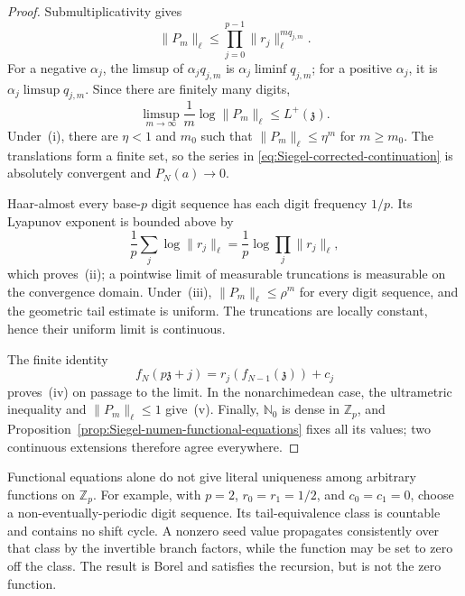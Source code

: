\begin{proof}
Submultiplicativity gives
\[
 \lVert P_m\rVert_\ell
 \leq\prod_{j=0}^{p-1}
      \lVert r_j\rVert_\ell^{m q_{j,m}}.
\]
For a negative $\alpha_j$, the limsup of
$\alpha_jq_{j,m}$ is $\alpha_j\liminf q_{j,m}$; for a positive
$\alpha_j$, it is $\alpha_j\limsup q_{j,m}$.  Since there are finitely many
digits,
\[
 \limsup_{m\to\infty}\frac1m\log\lVert P_m\rVert_\ell
 \leq L^+(\mathfrak z).
\]
Under~(i), there are $\eta<1$ and $m_0$ such that
$\lVert P_m\rVert_\ell\leq\eta^m$ for $m\geq m_0$.  The translations form a
finite set, so the series in
\eqref{eq:Siegel-corrected-continuation} is absolutely convergent and
$P_N(a)\to0$.

Haar-almost every base-$p$ digit sequence has each digit frequency $1/p$.
Its Lyapunov exponent is bounded above by
\[
 \frac1p\sum_j\log\lVert r_j\rVert_\ell
 =\frac1p\log\prod_j\lVert r_j\rVert_\ell,
\]
which proves~(ii); a pointwise limit of measurable truncations is measurable
on the convergence domain.  Under~(iii),
$\lVert P_m\rVert_\ell\leq\rho^m$ for every digit sequence, and the geometric
tail estimate is uniform.  The truncations are locally constant, hence their
uniform limit is continuous.

The finite identity
\[
 f_N(p\mathfrak z+j)=r_j(f_{N-1}(\mathfrak z))+c_j
\]
proves~(iv) on passage to the limit.  In the nonarchimedean case, the
ultrametric inequality and $\lVert P_m\rVert_\ell\leq1$ give~(v).
Finally, $\mathbb N_0$ is dense in $\mathbb Z_p$, and
Proposition~\ref{prop:Siegel-numen-functional-equations} fixes all its values;
two continuous extensions therefore agree everywhere.
\end{proof}

Functional equations alone do not give literal uniqueness among arbitrary
functions on $\mathbb Z_p$.  For example, with $p=2$,
$r_0=r_1=1/2$, and $c_0=c_1=0$, choose a non-eventually-periodic digit
sequence.  Its tail-equivalence class is countable and contains no shift
cycle.  A nonzero seed value propagates consistently over that class by the
invertible branch factors, while the function may be set to zero off the
class.  The result is Borel and satisfies the recursion, but is not the zero
function.

